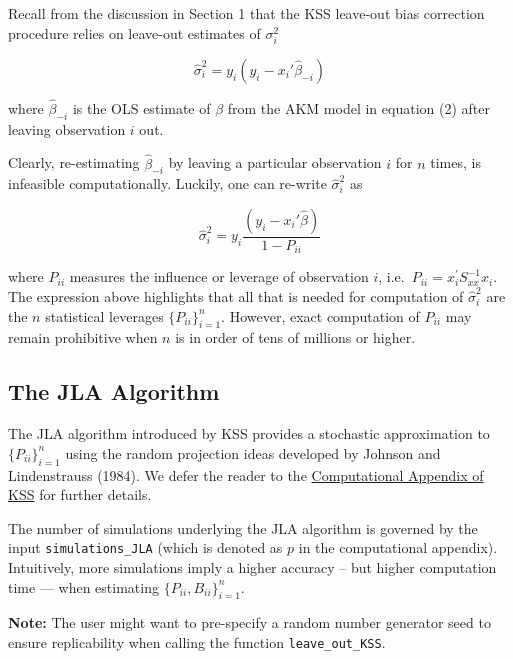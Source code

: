 \documentclass[11pt]{article}
\begin{document}
Recall from the discussion in Section 1 that the KSS leave-out bias
correction procedure relies on leave-out estimates of \(\sigma^{2}_{i}\)

\begin{equation}
\hat{\sigma}^{2}_{i}=y_{i}(y_{i}-x_{i}'\hat{\beta}_{-i})
\end{equation}

where \(\hat{\beta}_{-i}\) is the OLS estimate of \(\beta\) from the AKM
model in equation (2) after leaving observation \(i\) out.

Clearly, re-estimating \(\hat{\beta}_{-i}\) by leaving a particular
observation \(i\) for \(n\) times, is infeasible computationally.
Luckily, one can re-write \(\hat{\sigma}^{2}_{i}\) as

\begin{equation}
\hat{\sigma}^{2}_{i}=y_{i}\frac{(y_{i}-x_{i}'\hat{\beta})}{1-P_{ii}}
\end{equation}

where \(P_{ii}\) measures the influence or leverage of observation
\(i\), i.e.~\(P_{ii} =x_i^{\prime } S_{xx}^{-1} x_i\). The expression
above highlights that all that is needed for computation of
\(\hat{\sigma}^{2}_{i}\) are the \(n\) statistical leverages
\(\{P_{ii}\}_{i=1}^{n}\). However, exact computation of \(P_{ii}\) may remain prohibitive when \(n\) is in order of tens of millions or
higher.

\hypertarget{the-jla-algorithm}{%
\subsection{The JLA Algorithm}\label{the-jla-algorithm}}

The JLA algorithm introduced by KSS provides a stochastic approximation
to \(\{P_{ii}\}_{i=1}^{n}\) using the random projection ideas developed
by Johnson and Lindenstrauss (1984). We defer the reader to the
\href{https://www.dropbox.com/s/ycvls8pbtxewj06/DataComputationAppendix.pdf?dl=1}{Computational Appendix of KSS} for further details.

The number of simulations underlying the JLA algorithm is governed by
the input \texttt{simulations\_JLA} (which is denoted as \(p\) in the
computational appendix). Intuitively, more simulations imply a
higher accuracy -- but higher computation time --- when estimating
\(\lbrace P_{ii} ,B_{ii} \rbrace_{i=1}^n\).

\textbf{Note:} The user might want to pre-specify a random number
generator seed to ensure replicability when calling the function
\texttt{leave\_out\_KSS}.
\end{document}
